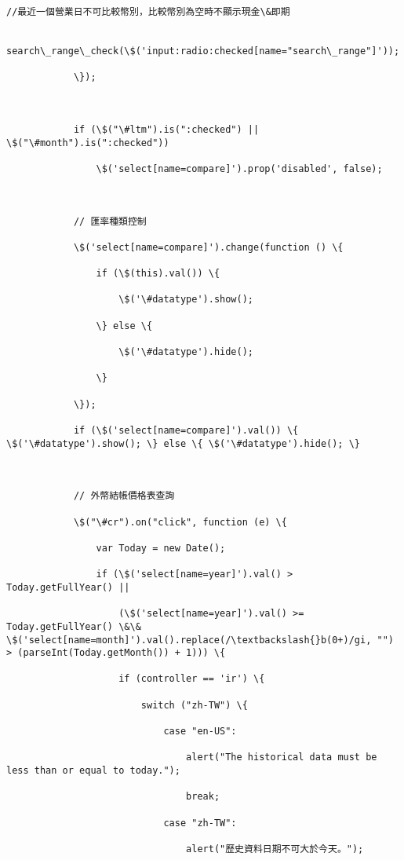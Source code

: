 \documentclass[11pt]{article}
\begin{document}
\begin{Verbatim}[commandchars=\\\{\}]
                //最近一個營業日不可比較幣別，比較幣別為空時不顯示現金\&即期

                search\_range\_check(\$('input:radio:checked[name="search\_range"]'));

            \});



            if (\$("\#ltm").is(":checked") || \$("\#month").is(":checked"))

                \$('select[name=compare]').prop('disabled', false);



            // 匯率種類控制

            \$('select[name=compare]').change(function () \{

                if (\$(this).val()) \{

                    \$('\#datatype').show();

                \} else \{

                    \$('\#datatype').hide();

                \}

            \});

            if (\$('select[name=compare]').val()) \{ \$('\#datatype').show(); \} else \{ \$('\#datatype').hide(); \}



            // 外幣結帳價格表查詢

            \$("\#cr").on("click", function (e) \{

                var Today = new Date();

                if (\$('select[name=year]').val() > Today.getFullYear() ||

                    (\$('select[name=year]').val() >= Today.getFullYear() \&\& \$('select[name=month]').val().replace(/\textbackslash{}b(0+)/gi, "") > (parseInt(Today.getMonth()) + 1))) \{

                    if (controller == 'ir') \{

                        switch ("zh-TW") \{

                            case "en-US":

                                alert("The historical data must be less than or equal to today.");

                                break;

                            case "zh-TW":

                                alert("歷史資料日期不可大於今天。");


\end{Verbatim}
\end{document}
